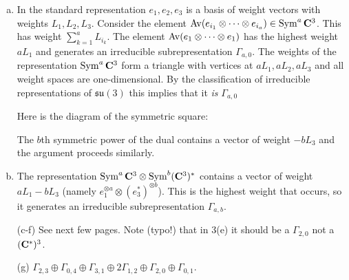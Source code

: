 \documentclass[12pt]{article}
\begin{document}
\begin{answer}
\begin{enumerate}[(a)]
\item In the standard representation $e_1,e_2,e_3$ is a basis of weight vectors with weights $L_1,L_2,L_3$. Consider the element $\operatorname{Av}(e_{i_1}\otimes\cdots\otimes e_{i_a})\in\operatorname{Sym}^a\mathbf{C}^3$. This has weight $\sum_{k=1}^aL_{i_k}$. The element $\operatorname{Av}(e_1\otimes\cdots\otimes e_1)$ has the highest weight $aL_1$ and generates an irreducible subrepresentation $\Gamma_{a,0}$. The weights of the representation $\operatorname{Sym}^a\mathbf{C}^3$ form a triangle with vertices at $aL_1,aL_2,aL_3$ and all weight spaces are one-dimensional. By the classification of irreducible representations of $\mathfrak{su}(3)$ this implies that it {\em is} $\Gamma_{a,0}$

Here is the diagram of the symmetric square:


The $b$th symmetric power of the dual contains a vector of weight $-bL_3$ and the argument proceeds similarly.
\item The representation $\operatorname{Sym}^a\mathbf{C}^3\otimes\operatorname{Sym}^b(\mathbf{C}^3)^*$ contains a vector of weight $aL_1-bL_3$ (namely $e_1^{\otimes a}\otimes (e_3^*)^{\otimes b}$). This is the highest weight that occurs, so it generates an irreducible subrepresentation $\Gamma_{a,b}$.
\item[(c-f)] See next few pages. Note (typo!) that in 3(e) it should be a $\Gamma_{2,0}$ not a $(\mathbf{C}^*)^3$.
\item[(g)] $\Gamma_{2,3}\oplus\Gamma_{0,4}\oplus\Gamma_{3,1}\oplus 2\Gamma_{1,2}\oplus\Gamma_{2,0}\oplus\Gamma_{0,1}$.
\end{enumerate}

\end{answer}





\newpage

\bigskip
\end{document}

